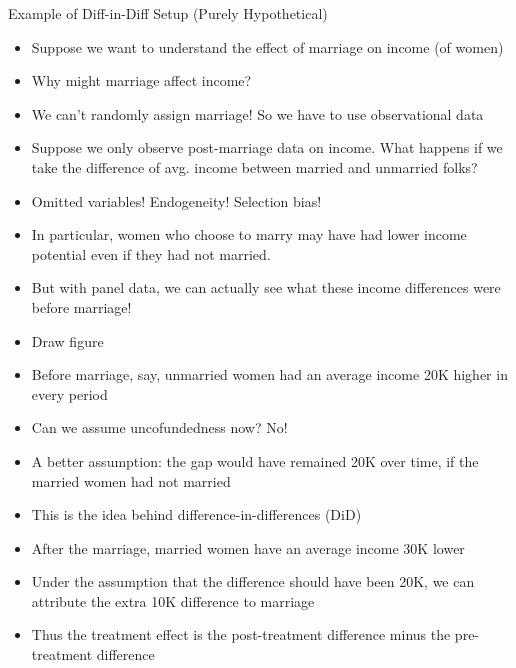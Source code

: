 \documentclass[11pt,notes=hide,aspectratio=169,mathserif]{beamer}
\begin{document}
\begin{frame}{Example of Diff-in-Diff Setup (Purely Hypothetical)}
\begin{itemize}
  \item Suppose we want to understand the effect of marriage on income (of women) 
  \item Why might marriage affect income? 
  \item We can't randomly assign marriage! So we have to use observational data
  \item Suppose we only observe post-marriage data on income. What happens if we take the difference of avg. income between married and unmarried folks?
  \item Omitted variables! Endogeneity! Selection bias!
  \item In particular, women who choose to marry may have had lower income potential even if they had not married.
  \item But with panel data, we can actually see what these income differences were before marriage!
\end{itemize}
\end{frame}

\begin{frame}{}
\begin{itemize}
  \item Draw figure \pause
  \item Before marriage, say, unmarried women had an average income 20K higher in every period 
  \item Can we assume uncofundedness now? \pause No! 
  \item A better assumption: the gap would have remained 20K over time, if the married women had not married
  \item This is the idea behind difference-in-differences (DiD)
\end{itemize}
\end{frame}

\begin{frame}{}
\begin{itemize}
  \item After the marriage, married women have an average income 30K lower 
  \item Under the assumption that the difference should have been 20K, we can attribute the extra 10K difference to marriage
  \item Thus the treatment effect is the post-treatment difference minus the pre-treatment difference
\end{itemize}
\end{frame}
\end{document}

